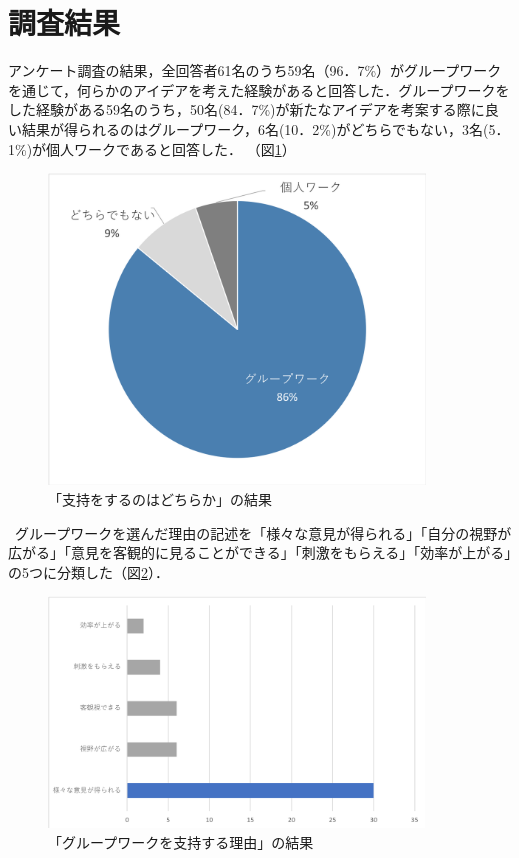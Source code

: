 \documentclass{funthesis}
\begin{document}
\section{調査結果}

アンケート調査の結果，全回答者61名のうち59名（96．7\%）がグループワークを通じて，何らかのアイデアを考えた経験があると回答した．グループワークをした経験がある59名のうち，50名(84．7\%)が新たなアイデアを考案する際に良い結果が得られるのはグループワーク，6名(10．2\%)がどちらでもない，3名(5．1\%)が個人ワークであると回答した．
（図\ref{graph0}）
\begin{figure}[H]
 \centering
   \includegraphics[width=100mm]{figures/finalchart1.png}
 \caption{「支持をするのはどちらか」の結果}
 \label{graph0}
\end{figure}

\ グループワークを選んだ理由の記述を「様々な意見が得られる」「自分の視野が広がる」「意見を客観的に見ることができる」「刺激をもらえる」「効率が上がる」の5つに分類した（図\ref{graph1}）．
\begin{figure}[H]
 \centering
   \includegraphics[width=100mm]{figures/finalchart5.png}
 \caption{「グループワークを支持する理由」の結果}
 \label{graph1}
\end{figure}
\end{document}
